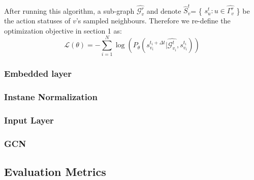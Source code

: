\paragraph{} After running this algorithm, a sub-graph $\hat{\mathcal{G}_v^r}$ and denote $\hat{S}_v^t$=
\{ $s_u^t :u \in \hat{\Gamma_v^r}$ \} be the action statuses of $v$'s sampled neighbours. Therefore we re-define the optimization
objective in section 1 as:
\begin{equation}
    \mathcal{L}(\theta) = -\sum_{i=1}^N \log(P_{\theta}(s_{v_i}^{t_i+\Delta t}|\hat{\mathcal{G}_{v_i}^{t}},s_{v_i}^{t_i}))
\end{equation}
\subsubsection{Embedded layer}
\subsubsection{Instane Normalization}
\subsubsection{Input Layer}
\subsubsection{GCN}
\subsection{Evaluation Metrics}